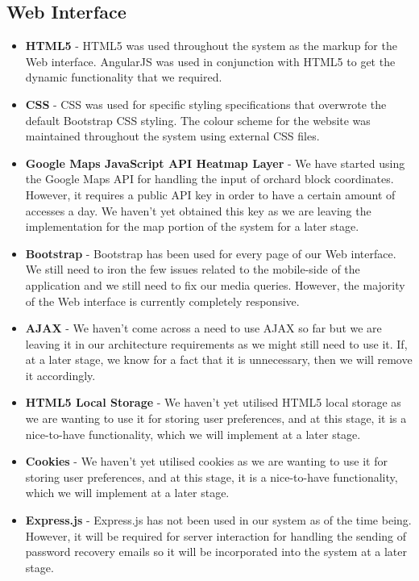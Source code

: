 \documentclass[11pt,fleqn]{book} %
\begin{document}
		\subsection{Web Interface}
			\begin{itemize}
				\item\textbf{HTML5} -
				HTML5 was used throughout the system as the markup for the Web interface. AngularJS was used in conjunction with HTML5 to get the dynamic functionality that we required.
				
				\item\textbf{CSS} -
				CSS was used for specific styling specifications that overwrote the default Bootstrap CSS styling. The colour scheme for the website was maintained throughout the system using external CSS files.
				
				\item\textbf{Google Maps JavaScript API Heatmap Layer} -
				We have started using the Google Maps API for handling the input of orchard block coordinates. However, it requires a public API key in order to have a certain amount of accesses a day. We haven't yet obtained this key as we are leaving the implementation for the map portion of the system for a later stage.
				
				\item\textbf{Bootstrap} -
				Bootstrap has been used for every page of our Web interface. We still need to iron the few issues related to the mobile-side of the application and we still need to fix our media queries. However, the majority of the Web interface is currently completely responsive.
				
				\item\textbf{AJAX} -
				We haven't come across a need to use AJAX so far but we are leaving it in our architecture requirements as we might still need to use it. If, at a later stage, we know for a fact that it is unnecessary, then we will remove it accordingly.
				
				\item\textbf{HTML5 Local Storage} -
				We haven't yet utilised HTML5 local storage as we are wanting to use it for storing user preferences, and at this stage, it is a nice-to-have functionality, which we will implement at a later stage.
				
				\item\textbf{Cookies} -
				We haven't yet utilised cookies as we are wanting to use it for storing user preferences, and at this stage, it is a nice-to-have functionality, which we will implement at a later stage.
				
				\item\textbf{Express.js} -
				Express.js has not been used in our system as of the time being. However, it will be required for server interaction for handling the sending of password recovery emails so it will be incorporated into the system at a later stage.
			\end{itemize}
\end{document}
